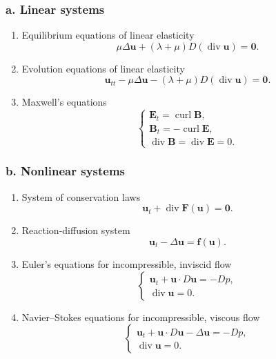 \subsubsection*{a. Linear systems}
\begin{enumerate}
\item Equilibrium equations of linear elasticity
\[ \mu\Delta\mathbf u+(\lambda+\mu)D(\operatorname{div}\mathbf u)=\mathbf0. \]
\item Evolution equations of linear elasticity
\[ \mathbf u_{tt}-\mu\Delta\mathbf u
 -(\lambda+\mu)D(\operatorname{div}\mathbf u)=\mathbf0. \]
\item Maxwell's equations
\[
 \begin{cases}
 \mathbf E_t=\operatorname{curl}\mathbf B,\\
 \mathbf B_t=-\operatorname{curl}\mathbf E,\\
 \operatorname{div}\mathbf B=\operatorname{div}\mathbf E=0.
 \end{cases}
\]
\end{enumerate}
\par\Needspace{65mm}

\subsubsection*{b. Nonlinear systems}
\begin{enumerate}
\item System of conservation laws
\[ \mathbf u_t+\operatorname{div}\mathbf F(\mathbf u)=\mathbf0. \]
\item Reaction-diffusion system
\[ \mathbf u_t-\Delta\mathbf u=\mathbf f(\mathbf u). \]
\item Euler's equations for incompressible, inviscid flow
\[
 \begin{cases}
 \mathbf u_t+\mathbf u\cdot D\mathbf u=-Dp,\\
 \operatorname{div}\mathbf u=0.
 \end{cases}
\]
\item Navier--Stokes equations for incompressible, viscous flow
\[
 \begin{cases}
 \mathbf u_t+\mathbf u\cdot D\mathbf u-\Delta\mathbf u=-Dp,\\
 \operatorname{div}\mathbf u=0.
 \end{cases}
\]
\end{enumerate}
\par\Needspace{65mm}

